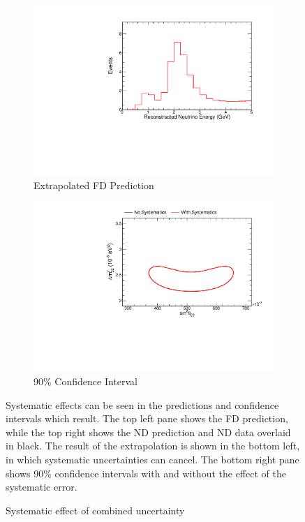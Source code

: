 {\begin{figure}
\begin{center}
\begin{subfigure}[c]{0.49\textwidth}
\includegraphics[width=\textwidth]{figures/systs/prediction/fd_extrap_prediction_numuSumSmallGENIE.pdf}
\caption*{Extrapolated FD Prediction}
\end{subfigure}
\begin{subfigure}[c]{0.49\textwidth}
\includegraphics[width=\textwidth]{figures/systs/prediction/fd_extrap_contour_numuSumSmallGENIE.pdf}
\caption*{90\% Confidence Interval}
\end{subfigure}
\end{center}
\caption{Systematic effect of combined \genie uncertainty}{
Systematic effects can be seen in the predictions and confidence intervals
which result.
The top left pane shows the FD prediction, while the top right shows the
ND prediction and ND data overlaid in black.
The result of the extrapolation is shown in the bottom left, in which
systematic uncertainties can cancel.
The bottom right pane shows 90\% confidence intervals with and without
the effect of the systematic error.}
\label{syst_fig_numuSumSmallGENIE}


\end{figure}}
